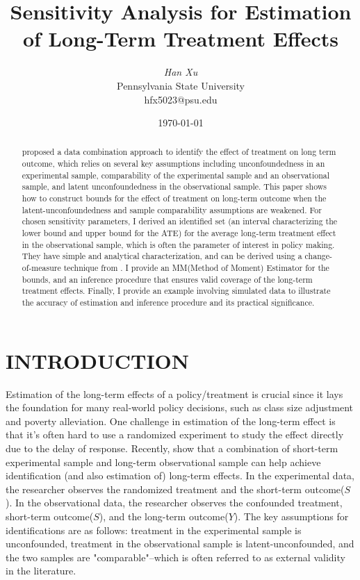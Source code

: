 \documentclass[12pt]{article}
\title{\bfseries\Large Sensitivity Analysis for Estimation of Long-Term Treatment Effects \vspace*{-1ex}}
\author{\large\textit{Han Xu} \\
	\large \textup{Pennsylvania State University}\\\textup{hfx5023@psu.edu}}
\date{\today}
\begin{document}
	
	\maketitle
	
	\begin{abstract}
	\textcite{athey2020combining} proposed a data combination approach to identify the effect of treatment on long term outcome, which relies on several key assumptions including unconfoundedness in an experimental sample, comparability of the experimental sample and an observational sample, and latent unconfoundedness in the observational sample. This paper shows how to construct bounds for the effect of treatment on long-term outcome when the latent-unconfoundedness and sample comparability assumptions are weakened. For chosen sensitivity parameters, I derived an identified set (an interval characterizing the lower bound and upper bound for the ATE) for the average long-term treatment effect in the observational sample, which is often the parameter of interest in policy making.
    They have simple and analytical characterization, and can be derived using a change-of-measure technique from \textcite{yadlowsky2018bounds}. 
    I provide an MM(Method of Moment) Estimator for the bounds, and an inference procedure that ensures valid coverage of the long-term treatment effects.
    Finally, I provide an example involving simulated data to illustrate the accuracy of estimation and inference procedure and its practical significance.
	\end{abstract}

    \section{INTRODUCTION}
    
    Estimation of the long-term effects of a policy/treatment is crucial since it lays the foundation for many real-world policy decisions, such as class size adjustment and poverty alleviation. One challenge in estimation of the long-term effect is that it's often hard to use a randomized experiment to study the effect directly due to the delay of response. Recently, \textcite{athey2020combining} show that a combination of short-term experimental sample and long-term observational sample can help achieve identification (and also estimation of) long-term effects. In the experimental data, the researcher observes the randomized treatment and the short-term outcome($S$). In the observational data, the researcher observes the confounded treatment, short-term outcome($S$), and the long-term outcome($Y$). The key assumptions for identifications are as follows: treatment in the experimental sample is unconfounded, treatment in the observational sample is latent-unconfounded, and the two samples are "comparable"--which is often referred to as external validity in the literature.
	
\end{document}
